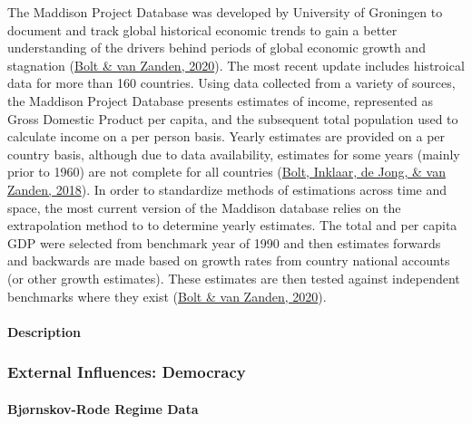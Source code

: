\documentclass[12pt,twoside]{reedthesis}
\begin{document}
The Maddison Project Database was developed by University of Groningen to document and track global historical economic trends to gain a better understanding of the drivers behind periods of global economic growth and stagnation (\protect\hyperlink{ref-boltMaddisonStyleEstimates2020}{Bolt \& van Zanden, 2020}). The most recent update includes histroical data for more than 160 countries. Using data collected from a variety of sources, the Maddison Project Database presents estimates of income, represented as Gross Domestic Product per capita, and the subsequent total population used to calculate income on a per person basis. Yearly estimates are provided on a per country basis, although due to data availability, estimates for some years (mainly prior to 1960) are not complete for all countries (\protect\hyperlink{ref-boltRebasingMaddisonNew2018}{Bolt, Inklaar, de Jong, \& van Zanden, 2018}). In order to standardize methods of estimations across time and space, the most current version of the Maddison database relies on the extrapolation method to to determine yearly estimates. The total and per capita GDP were selected from benchmark year of 1990 and then estimates forwards and backwards are made based on growth rates from country national accounts (or other growth estimates). These estimates are then tested against independent benchmarks where they exist (\protect\hyperlink{ref-boltMaddisonStyleEstimates2020}{Bolt \& van Zanden, 2020}).

\hypertarget{description}{%
\paragraph{Description}\label{description}}

\hypertarget{democracy}{%
\subsubsection{External Influences: Democracy}\label{democracy}}

\hypertarget{BRdemo}{%
\paragraph{Bjørnskov-Rode Regime Data}\label{BRdemo}}
\end{document}
